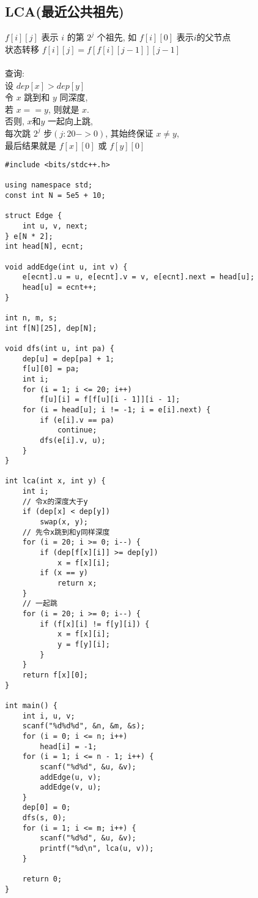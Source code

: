 \subsection{LCA(最近公共祖先)}
    $f[i][j]$ 表示 $i$ 的第 $2^j$ 个祖先, 如 $f[i][0]$ 表示$i$的父节点\\
    状态转移 $f[i][j] = f[f[i][j-1]][j-1]$\\\\
    查询:\\
    设 $dep[x] > dep[y]$\\
    令 $x$ 跳到和 $y$ 同深度,\\
    若 $x == y$, 则就是 $x$.\\
    否则, $x$和$y$ 一起向上跳,\\
    每次跳 $2^j$ 步$(j:20->0)$, 其始终保证 $x\neq y$,\\
    最后结果就是 $f[x][0]$ 或 $f[y][0]$
\begin{lstlisting}
#include <bits/stdc++.h>

using namespace std;
const int N = 5e5 + 10;

struct Edge {
    int u, v, next;
} e[N * 2];
int head[N], ecnt;

void addEdge(int u, int v) {
    e[ecnt].u = u, e[ecnt].v = v, e[ecnt].next = head[u];
    head[u] = ecnt++;
}

int n, m, s;
int f[N][25], dep[N];

void dfs(int u, int pa) {
    dep[u] = dep[pa] + 1;
    f[u][0] = pa;
    int i;
    for (i = 1; i <= 20; i++)
        f[u][i] = f[f[u][i - 1]][i - 1];
    for (i = head[u]; i != -1; i = e[i].next) {
        if (e[i].v == pa)
            continue;
        dfs(e[i].v, u);
    }
}

int lca(int x, int y) {
    int i;
    // 令x的深度大于y
    if (dep[x] < dep[y])
        swap(x, y);
    // 先令x跳到和y同样深度
    for (i = 20; i >= 0; i--) {
        if (dep[f[x][i]] >= dep[y])
            x = f[x][i];
        if (x == y)
            return x;
    }
    // 一起跳
    for (i = 20; i >= 0; i--) {
        if (f[x][i] != f[y][i]) {
            x = f[x][i];
            y = f[y][i];
        }
    }
    return f[x][0];
}

int main() {
    int i, u, v;
    scanf("%d%d%d", &n, &m, &s);
    for (i = 0; i <= n; i++)
        head[i] = -1;
    for (i = 1; i <= n - 1; i++) {
        scanf("%d%d", &u, &v);
        addEdge(u, v);
        addEdge(v, u);
    }
    dep[0] = 0;
    dfs(s, 0);
    for (i = 1; i <= m; i++) {
        scanf("%d%d", &u, &v);
        printf("%d\n", lca(u, v));
    }

    return 0;
}
\end{lstlisting}